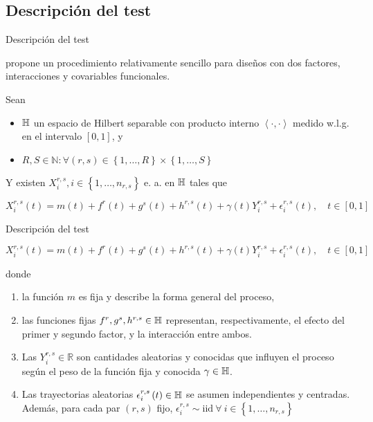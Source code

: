 \documentclass[10pt,spanish,handout]{beamer}\usepackage[]{graphicx}\usepackage[]{color}
\begin{document}
\subsection{Descripción del test}
\begin{frame}{Descripción del test}

\cite{Cuesta 2010} propone un procedimiento relativamente sencillo
para diseños con dos factores, interacciones y covariables funcionales.

\pause{}

Sean
\begin{itemize}
\item $\mathbb{H}$ un espacio de Hilbert separable con producto interno $\left\langle \cdot,\cdot\right\rangle $
medido w.l.g. en el intervalo $\left[0,1\right]$, y
\item $R,S\in\mathbb{N}:\forall\left(r,s\right)\in\left\{ 1,\dots,R\right\} \times\left\{ 1,\dots,S\right\} $ 
\end{itemize}

\pause{}

Y existen $X_{i}^{r,s},i\in\left\{ 1,\dots,n_{r,s}\right\} $ e. a.
en $\mathbb{H}$ tales que

\vspace{-15pt}

\[
X_{i}^{r,s}\left(t\right)=m\left(t\right)+f^{r}\left(t\right)+g^{s}\left(t\right)+h^{r,s}\left(t\right)+\gamma\left(t\right)Y_{i}^{r,s}+\epsilon_{i}^{r,s}\left(t\right),\quad t\in\left[0,1\right]
\]

\end{frame}
%
\begin{frame}{Descripción del test}

\[
X_{i}^{r,s}\left(t\right)=m\left(t\right)+f^{r}\left(t\right)+g^{s}\left(t\right)+h^{r,s}\left(t\right)+\gamma\left(t\right)Y_{i}^{r,s}+\epsilon_{i}^{r,s}\left(t\right),\quad t\in\left[0,1\right]
\]


\pause{}

donde
\begin{enumerate}[<+->]
\item la función $m$ es fija y describe la forma general del proceso,
\item las funciones fijas $f^{r},g^{s},h^{r,s}\in\mathbb{H}$ representan, respectivamente,
el efecto del primer y segundo factor, y la interacción entre ambos.
\item Las $Y_{i}^{r,s}\in\mathbb{R}$ son cantidades aleatorias y conocidas
que influyen el proceso según el peso de la función fija y conocida
$\gamma\in\mathbb{H}$.
\item Las trayectorias aleatorias $\epsilon_{i}^{r,s}\left(t\right)\in\mathbb{H}$
se asumen independientes y centradas. Además, para cada par $\left(r,s\right)$
fijo, $\epsilon_{i}^{r,s}\sim\text{iid}\ \forall\ i\in\left\{ 1,\dots,n_{r,s}\right\} $
\end{enumerate}
\end{frame}
\end{document}
